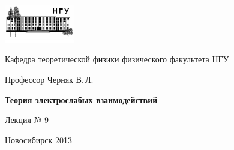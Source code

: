\documentclass[12pt,pagesize,paper=192mm:108mm]{scrbook}
\begin{document}
\begin{titlepage}
  \vspace*{-1em}
  \begin{center}
    \includegraphics[width=0.23\textwidth]{../NSU-logo}

    Кафедра теоретической физики физического факультета НГУ
    \medskip

    \Large
    Профессор Черняк В.\,Л.
    \bigskip

    \huge
    \textbf{Теория электрослабых взаимодействий}
    \bigskip

    \Large
    Лекция № 9
    \vfill

    \vfill

    \normalsize \ccbysa\hspace{0.5em}  Новосибирск 2013
  \end{center}
\end{titlepage}
\end{document}
